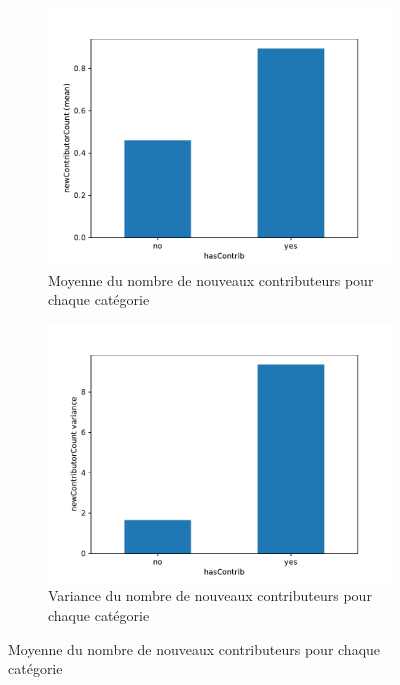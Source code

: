 \documentclass[dvipsnames,runningheads]{llncs}
\begin{document}
    \begin{figure}[ht]
        \begin{subfigure}[t]{0.5\textwidth}
            \includegraphics[width=\textwidth]{../experiment/data_analysis/hasContrib_meanNewContributorCount}
            \caption{Moyenne du nombre de nouveaux contributeurs pour chaque catégorie}
        \end{subfigure}%
        \begin{subfigure}[t]{0.5\textwidth}
            \includegraphics[width=\textwidth]{../experiment/data_analysis/hasContrib_varianceNewContributorCount}
            \caption{Variance du nombre de nouveaux contributeurs pour chaque catégorie}
            \label{sfig:hasContribVariance}
        \end{subfigure}

        
        \caption{Moyenne du nombre de nouveaux contributeurs pour chaque catégorie}
        \label{fig:hasContrib}
    \end{figure}
\end{document}
